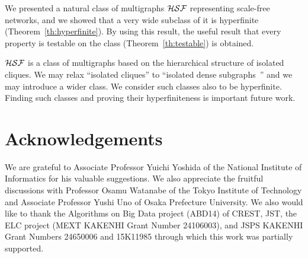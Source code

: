 \documentclass[11pt]{article}
\begin{document}
We presented a natural class of multigraphs ${\cal HSF}$
representing scale-free networks, and we showed that a very wide subclass of it is hyperfinite (Theorem~\ref{th:hyperfinite}). 
By using this result, the useful result that every property is testable on the class (Theorem~\ref{th:testable}) is obtained. 


${\cal HSF}$ is a class of multigraphs based on the hierarchical structure of isolated cliques.  
We may relax ``isolated cliques'' to ``isolated dense subgraphs~\cite{IsoClique_TALG09}''
and we may introduce a wider class.  
We consider such classes also to be hyperfinite.  
Finding such classes and proving their hyperfiniteness is important future work.  

 
 




























\section*{Acknowledgements}
We are grateful to Associate Professor Yuichi Yoshida of 
the National Institute of Informatics for his valuable suggestions. 
We also appreciate the fruitful discussions with Professor Osamu Watanabe of the Tokyo Institute of Technology and Associate Professor Yushi Uno of Osaka Prefecture University. 
We also would like to thank the Algorithms on Big Data project (ABD14) of CREST, JST, 
the ELC project (MEXT KAKENHI Grant Number 24106003), and JSPS KAKENHI Grant Numbers 24650006 and 15K11985 through which this work was partially supported. 
\end{document}
